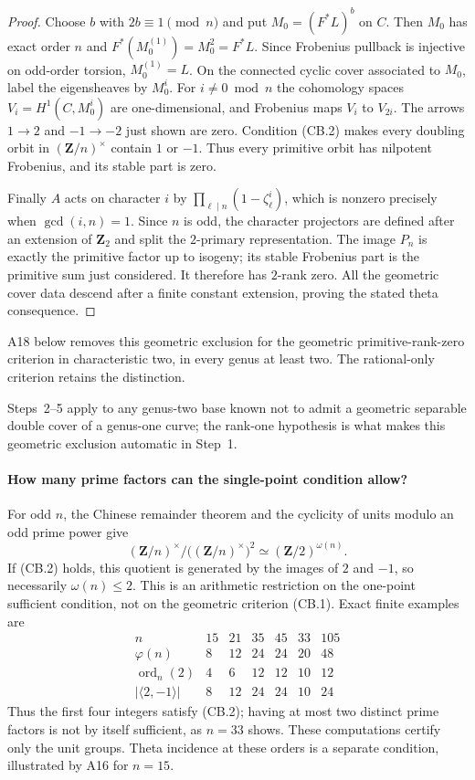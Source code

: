 \begin{proof}
Choose $b$ with $2b\equiv1\pmod n$ and put $M_0=(F^*L)^b$ on $C$.
Then $M_0$ has exact order $n$ and
$F^*(M_0^{(1)})=M_0^2=F^*L$. Since Frobenius pullback is
injective on odd-order torsion, $M_0^{(1)}=L$. On the connected
cyclic cover associated to $M_0$, label the eigensheaves by $M_0^i$.
For $i\ne0\bmod n$ the cohomology spaces
$V_i=H^1(C,M_0^i)$ are one-dimensional, and Frobenius maps
$V_i$ to $V_{2i}$. The arrows $1\to2$ and $-1\to-2$ just shown
are zero. Condition (CB.2) makes every doubling orbit in
$(\mathbf Z/n)^\times$ contain $1$ or $-1$. Thus every primitive
orbit has nilpotent Frobenius, and its stable part is zero.

Finally $A$ acts on character $i$ by
$\prod_{\ell\mid n}(1-\zeta_\ell^i)$, which is nonzero precisely
when $\gcd(i,n)=1$. Since $n$ is odd, the character projectors are
defined after an extension of $\mathbf Z_2$ and split the
$2$-primary representation. The image $P_n$ is exactly the
primitive factor up to isogeny; its stable Frobenius part is the
primitive sum just considered. It therefore has $2$-rank zero.
All the geometric cover data descend after a finite constant
extension, proving the stated theta consequence.
\end{proof}

A18 below removes this geometric exclusion for the geometric
primitive-rank-zero criterion in characteristic two, in every genus
at least two. The rational-only criterion retains the distinction.

Steps~2--5 apply to any genus-two base known not to admit a geometric
separable double cover of a genus-one curve; the rank-one hypothesis
is what makes this geometric exclusion automatic in Step~1.

\paragraph{How many prime factors can the single-point condition allow?}
For odd $n$, the Chinese remainder theorem and the cyclicity of units
modulo an odd prime power give
\[
 (\mathbf Z/n)^\times/\bigl((\mathbf Z/n)^\times\bigr)^2
                  \simeq (\mathbf Z/2)^{\omega(n)}.
\]
If (CB.2) holds, this quotient is generated by the images of $2$ and
$-1$, so necessarily $\omega(n)\le2$. This is an arithmetic
restriction on the one-point sufficient condition, not on the
geometric criterion (CB.1). Exact finite examples are
\[
\begin{array}{c|rrrrrr}
 n&15&21&35&45&33&105\\ \hline
 \varphi(n)&8&12&24&24&20&48\\
 \operatorname{ord}_n(2)&4&6&12&12&10&12\\
 |\langle2,-1\rangle|&8&12&24&24&10&24
\end{array}
\]
Thus the first four integers satisfy (CB.2); having at most two
distinct prime factors is not by itself sufficient, as $n=33$ shows.
These computations certify only the unit groups. Theta incidence at
these orders is a separate condition, illustrated by A16 for $n=15$.

